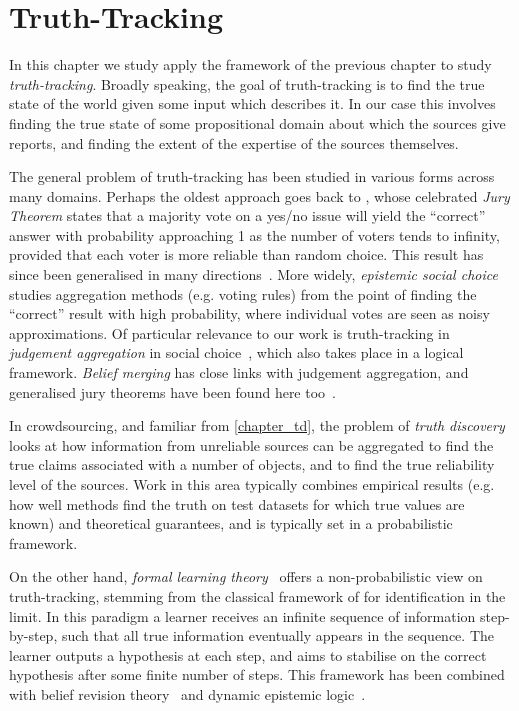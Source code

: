 \chapter{Truth-Tracking}
\label{chapter_truthtracking}

In this chapter we study apply the framework of the previous chapter to study
\emph{truth-tracking}.
%
Broadly speaking, the goal of truth-tracking is to find
the true state of the world given some input which describes it. In our case
this involves finding the true state of some propositional domain about which
the sources give reports, and finding the extent of the expertise of the
sources themselves.

The general problem of truth-tracking has been studied in various forms across
many domains. Perhaps the oldest approach goes back to \textcite{condorcet}, whose
celebrated \emph{Jury Theorem} states that a majority vote on a yes/no issue
will yield the ``correct'' answer with probability approaching 1 as the number
of voters tends to infinity, provided that each voter is more reliable than
random choice. This result has since been generalised in many
directions~\cite{grofman1983thirteen}. More widely, \emph{epistemic social
choice}~\cite{elkind2016rationalizations} studies aggregation methods (e.g.
voting rules) from the point of finding the ``correct'' result with high
probability, where individual votes are seen as noisy approximations. Of
particular relevance to our work is truth-tracking in \emph{judgement
aggregation} in social
choice~\cite{hartmann_judgment_2012,TerzopoulouEndrissSAGT2019}, which also
takes place in a logical framework. \emph{Belief merging} has close links with
judgement aggregation, and generalised jury theorems have been found here
too~\cite{everaere_epistemic_2010}.

In crowdsourcing, and familiar from \cref{chapter_td}, the problem of
\emph{truth discovery}~\cite{li_survey_2016} looks at how information from
unreliable sources can be aggregated to find the true claims associated with a
number of objects, and to find the true reliability level of the sources.
Work in this area typically combines empirical results (e.g. how well methods
find the truth on test datasets for which true values are known) and
theoretical guarantees, and is typically set in a probabilistic framework.

On the other hand, \emph{formal learning theory}~\cite{jain1999systems} offers
a non-probabilistic view on truth-tracking, stemming from the classical
framework of \textcite{Gold_1967} for identification in the limit. In this
paradigm a learner receives an infinite sequence of information step-by-step,
such that all true information eventually appears in the sequence. The learner
outputs a hypothesis at each step, and aims to stabilise on the correct
hypothesis after some finite number of steps. This framework has been combined
with belief revision theory~\cite{kelly1997reliable,baltag_tt_2019} and dynamic
epistemic logic~\cite{baltag2019dynamic}.

